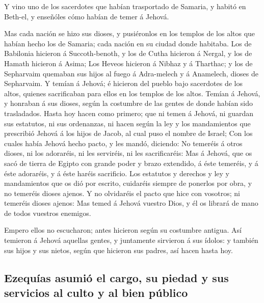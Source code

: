  Y vino uno de los sacerdotes que habían trasportado de
Samaria, y habitó en Beth-el, y enseñóles cómo habían de temer á Jehová.

 Mas cada nación se hizo sus dioses, y pusiéronlos en los
templos de los altos que habían hecho los de Samaria; cada nación en su
ciudad donde habitaba.  Los de Babilonia hicieron á
Succoth-benoth, y los de Cutha hicieron á Nergal, y los de Hamath
hicieron á Asima;  Los Heveos hicieron á Nibhaz y á
Tharthac; y los de Sepharvaim quemaban sus hijos al fuego á Adra-melech
y á Anamelech, dioses de Sepharvaim.  Y temían á Jehová; é
hicieron del pueblo bajo sacerdotes de los altos, quienes sacrificaban
para ellos en los templos de los altos.  Temían á Jehová, y
honraban á sus dioses, según la costumbre de las gentes de donde habían
sido trasladados.  Hasta hoy hacen como primero; que ni
temen á Jehová, ni guardan sus estatutos, ni sus ordenanzas, ni hacen
según la ley y los mandamientos que prescribió Jehová á los hijos de
Jacob, al cual puso el nombre de Israel;  Con los cuales
había Jehová hecho pacto, y les mandó, diciendo: No temeréis á otros
dioses, ni los adoraréis, ni les serviréis, ni les sacrificaréis:
 Mas á Jehová, que os sacó de tierra de Egipto con grande
poder y brazo extendido, á éste temeréis, y á éste adoraréis, y á éste
haréis sacrificio.  Los estatutos y derechos y ley y
mandamientos que os dió por escrito, cuidaréis siempre de ponerlos por
obra, y no temeréis dioses ajenos.  Y no olvidaréis el
pacto que hice con vosotros; ni temeréis dioses ajenos: 
Mas temed á Jehová vuestro Dios, y él os librará de mano de todos
vuestros enemigos.

 Empero ellos no escucharon; antes hicieron según su
costumbre antigua.  Así temieron á Jehová aquellas gentes,
y juntamente sirvieron á sus ídolos: y también sus hijos y sus nietos,
según que hicieron sus padres, así hacen hasta hoy.

\hypertarget{ezequuxedas-asumiuxf3-el-cargo-su-piedad-y-sus-servicios-al-culto-y-al-bien-puxfablico}{%
\subsection{Ezequías asumió el cargo, su piedad y sus servicios al culto
y al bien
público}\label{ezequuxedas-asumiuxf3-el-cargo-su-piedad-y-sus-servicios-al-culto-y-al-bien-puxfablico}}


